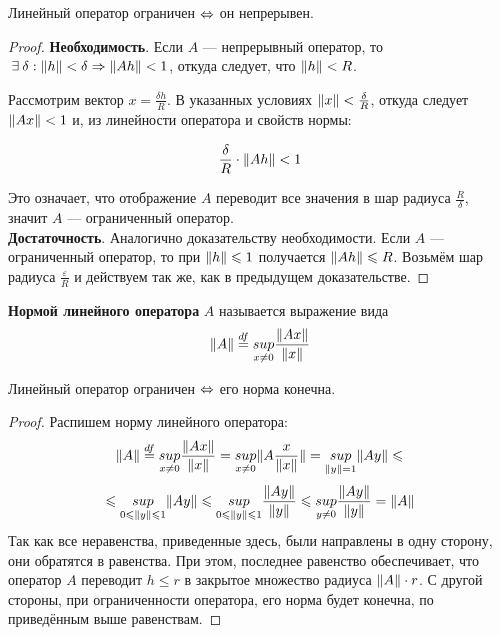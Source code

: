 \documentclass[12pt]{article}
\begin{document}
	\begin{state}
		Линейный оператор ограничен $\Leftrightarrow$ он непрерывен.
	\end{state}
	\begin{proof}
		\textbf{Необходимость}. Если $A$ --- непрерывный оператор, то 
		$ \exists \delta : \norm{h} < \delta \Rightarrow \norm{Ah} < 1 $,
		откуда следует, что $\| h \| < R$. 
		
		Рассмотрим вектор $x = \frac{\delta h}{R}$. В указанных условиях
		$\| x \| < \frac{\delta}{R}$, откуда следует $\| Ax \| < 1$ и, из линейности оператора и свойств нормы:

		$$\frac{\delta}{R} \cdot \| Ah \| < 1$$
		
		Это означает, что отображение $A$ переводит все значения в шар радиуса $\frac{R}{\delta}$, значит
		$A$ --- ограниченный оператор. \\
		
		\textbf{Достаточность}. Аналогично доказательству необходимости. Если $A$ --- ограниченный оператор,
		то при $\| h \| \leqslant 1$ получается $\| Ah \| \leqslant R$. Возьмём шар радиуса $\frac{\varepsilon}{R}$
		и действуем так же, как в предыдущем доказательстве.
	\end{proof}
	
	\begin{defi}
		\textbf{Нормой линейного оператора} $A$ называется выражение вида 
		$$\| A \| \overset{df}{=} \underset{x \neq 0}{sup} \frac{\| Ax \|}{\| x \|}$$
	\end{defi}
	
	\begin{state}
		Линейный оператор ограничен $\Leftrightarrow$ его норма конечна.
	\end{state}
	\begin{proof}
		Распишем норму линейного оператора:
		$$
			\| A \| \overset{df}{=} \underset{x \neq 0}{sup} \frac{\| Ax \|}{\| x \|} = 
			\underset{x \neq 0}{sup} \| A \frac{x}{\| x \|} \| =
			\underset{\| y \| = 1}{sup} \| Ay \| \leqslant
		$$
		$$
			\leqslant
			\underset{0 \leqslant \| y \| \leqslant 1}{sup} \| Ay \| \leqslant
			\underset{0 \leqslant \| y \| \leqslant 1}{sup} \frac{\| Ay \|}{\| y \|} \leqslant
			\underset{y \neq 0}{sup} \frac{\| Ay \|}{\| y \|} =
			\| A \|
		$$
		Так как все неравенства, приведенные здесь, были направлены в одну сторону,
		они обратятся в равенства. При этом, последнее равенство обеспечивает, что
		оператор $A$ переводит $h \leq r$ в закрытое множество радиуса $\| A \| \cdot r$.
		С другой стороны, при ограниченности оператора, его норма будет конечна, по приведённым
		выше равенствам.
	\end{proof}
	
\end{document}
